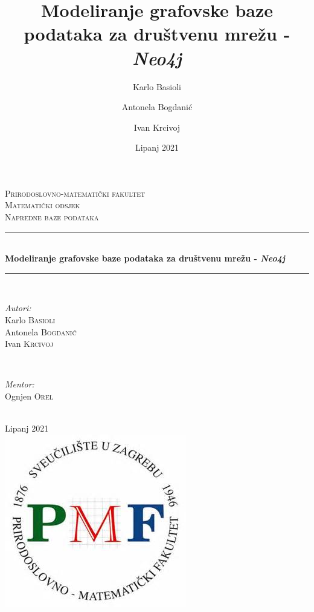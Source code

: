 \documentclass[titlepage, 12pt]{scrartcl}
\title{Modeliranje grafovske baze podataka za društvenu mrežu - \emph{Neo4j}}
\author{Karlo Basioli \and 
	Antonela Bogdanić \and 
	Ivan Krcivoj }
\date{Lipanj 2021}
\begin{document}
	
	\begin{titlepage}
		
		\newcommand{\HRule}{\rule{\linewidth}{0.5mm}}
		\center
		\textsc{\Large Prirodoslovno-matematički fakultet}\\[1.5cm] %
		\textsc{\large Matematički odsjek}\\[0.5cm] %
		\textsc{\large Napredne baze podataka}\\[0.5cm] 
		
		\HRule \\[0.4cm]
		{ \Large \bfseries Modeliranje grafovske baze podataka za društvenu mrežu - \emph{Neo4j}}\\[0.4cm] 
		\HRule \\[1.5cm]
		
		
		\begin{minipage}{0.4\textwidth}
			\begin{flushleft} \large
				\emph{Autori:}\\
				Karlo \textsc{Basioli} \\
				Antonela \textsc{Bogdanić} \\
				Ivan \textsc{Krcivoj}
			\end{flushleft}
		\end{minipage}
		~
		\begin{minipage}{0.4\textwidth}
			\begin{flushright} \large
				\emph{Mentor:} \\
				Ognjen \textsc{Orel} %
			\end{flushright}
		\end{minipage}\\[2cm]
		
		{\large Lipanj 2021}\\[2cm] 
		
		\includegraphics[scale=0.8]{slike/pmf_logo.jpg}\\
		
		\vfill 
		
	\end{titlepage}
	
\end{document}

